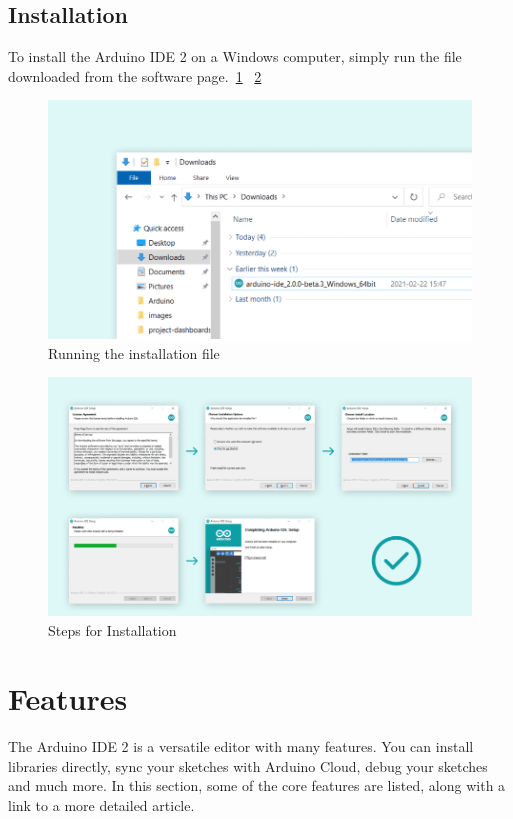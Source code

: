 	\subsection{Installation}
		To install the Arduino IDE 2 on a Windows computer, simply run the file downloaded from the software page.~\ref{downloading-and-installing-img01} ~\ref{downloading-and-installing-img02} \cite{arduino_ide_windows_tutorial:2025}
		\begin{figure}
			\begin{center}
				\includegraphics[width=0.7\linewidth]{Images/Arduino/downloading-and-installing-img01.png}
				\caption{Running the installation file}
				\label{downloading-and-installing-img01}
			\end{center}
		\end{figure}
		
		
		\begin{figure}
			\begin{center}
				\includegraphics[width=0.7\linewidth]{Images/Arduino/downloading-and-installing-img02.png}
				\caption{Steps for Installation}
				\label{downloading-and-installing-img02}
			\end{center}
		\end{figure}
	
	
\section{Features}
The Arduino IDE 2 is a versatile editor with many features. You can install libraries directly, sync your sketches with Arduino Cloud, debug your sketches and much more. In this section, some of the core features are listed, along with a link to a more detailed article. \cite{arduinodescription:2024} \cite{arduino_ide_environment:2025}

